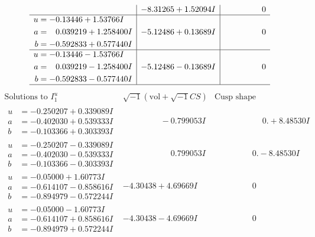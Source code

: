 \documentclass[1p]{elsarticle_modified}
\theoremstyle{definition}
\newcommand{\I}{\sqrt{-1}}
\begin{document}
$$\begin{array}{c|c|c}
 & -8.31265 + 1.52094 I & \phantom{-0.000000 } 0 \\ \hline\begin{aligned}
u &= -0.13446 + 1.53766 I \\
a &= \phantom{-}0.039219 + 1.258400 I \\
b &= -0.592833 + 0.577440 I\end{aligned}
 & -5.12486 + 0.13689 I & \phantom{-0.000000 } 0 \\ \hline\begin{aligned}
u &= -0.13446 - 1.53766 I \\
a &= \phantom{-}0.039219 - 1.258400 I \\
b &= -0.592833 - 0.577440 I\end{aligned}
 & -5.12486 - 0.13689 I & \phantom{-0.000000 } 0\\
 \hline 
 \end{array}$$\newpage$$\begin{array}{c|c|c}  
\text{Solutions to }I^u_{1}& \I (\text{vol} + \sqrt{-1}CS) & \text{Cusp shape}\\
 \hline 
\begin{aligned}
u &= -0.250207 + 0.339089 I \\
a &= -0.402030 + 0.539333 I \\
b &= -0.103366 + 0.303393 I\end{aligned}
 & \phantom{-0.000000 } -0.799053 I & \phantom{-0.000000 -}0. + 8.48530 I \\ \hline\begin{aligned}
u &= -0.250207 - 0.339089 I \\
a &= -0.402030 - 0.539333 I \\
b &= -0.103366 - 0.303393 I\end{aligned}
 & \phantom{-0.000000 -}0.799053 I & \phantom{-0.000000 } 0. - 8.48530 I \\ \hline\begin{aligned}
u &= -0.05000 + 1.60773 I \\
a &= -0.614107 - 0.858616 I \\
b &= -0.894979 - 0.572244 I\end{aligned}
 & -4.30438 + 4.69669 I & \phantom{-0.000000 } 0 \\ \hline\begin{aligned}
u &= -0.05000 - 1.60773 I \\
a &= -0.614107 + 0.858616 I \\
b &= -0.894979 + 0.572244 I\end{aligned}
 & -4.30438 - 4.69669 I & \phantom{-0.000000 } 0 \\ \hline\begin{aligned}

\end{aligned}
\end{array}$$
\end{document}
